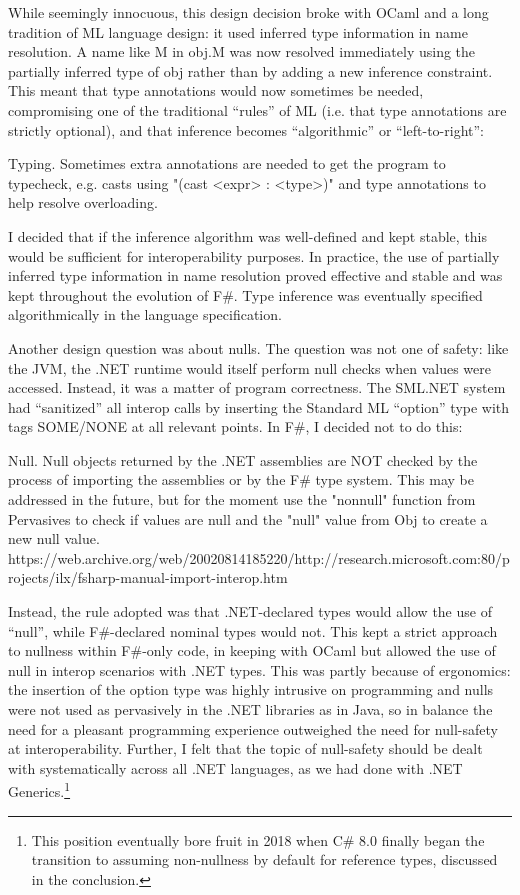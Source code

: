 \documentclass[acmsmall]{acmart}\settopmatter{}
\begin{document}
While seemingly innocuous, this design decision broke with OCaml and a long tradition of ML language design: it used inferred type information in name resolution. A name like M in obj.M was now resolved immediately using the partially inferred type of obj rather than by adding a new inference constraint. This meant that type annotations would now sometimes be needed, compromising one of the traditional “rules” of ML (i.e. that type annotations are strictly optional), and that inference becomes “algorithmic” or “left-to-right”:

\begin{verbquote}
Typing. Sometimes extra annotations are needed to get the program to typecheck, e.g. casts using "(cast <expr> : <type>)" and type annotations to help resolve overloading.
\end{verbquote}

I decided that if the inference algorithm was well-defined and kept stable, this would be sufficient for interoperability purposes. In practice, the use of partially inferred type information in name resolution proved effective and stable and was kept throughout the evolution of F\#.  Type inference was eventually specified algorithmically in the language specification. 

Another design question was about nulls. The question was not one of safety: like the JVM, the .NET runtime would itself perform null checks when values were accessed. Instead, it was a matter of program correctness. The SML.NET system had “sanitized” all interop calls by inserting the Standard ML “option” type with tags SOME/NONE at all relevant points.  In F\#, I decided not to do this:
\begin{verbquote}
Null.  Null objects returned by the .NET assemblies are NOT checked by the process of importing the assemblies or by the F# type system.  This may be addressed in the future, but for the moment use the "nonnull" function from Pervasives to check if values are null and the "null" value from Obj to create a new null value. https://web.archive.org/web/20020814185220/http://research.microsoft.com:80/projects/ilx/fsharp-manual-import-interop.htm
\end{verbquote}
Instead, the rule adopted was that .NET-declared types would allow the use of “null”, while F\#-declared nominal types would not.  This kept a strict approach to nullness within F\#-only code, in keeping with OCaml but allowed the use of null in interop scenarios with .NET types. This was partly because of ergonomics: the insertion of the option type was highly intrusive on programming and nulls were not used as pervasively in the .NET libraries as in Java, so in balance the need for a pleasant programming experience outweighed the need for null-safety at interoperability. Further, I felt that the topic of null-safety should be dealt with systematically across all .NET languages, as we had done with .NET Generics.\footnote{This position eventually bore fruit in 2018 when C\# 8.0 finally began the transition to assuming non-nullness by default for reference types, discussed in the conclusion.}   
\end{document}
